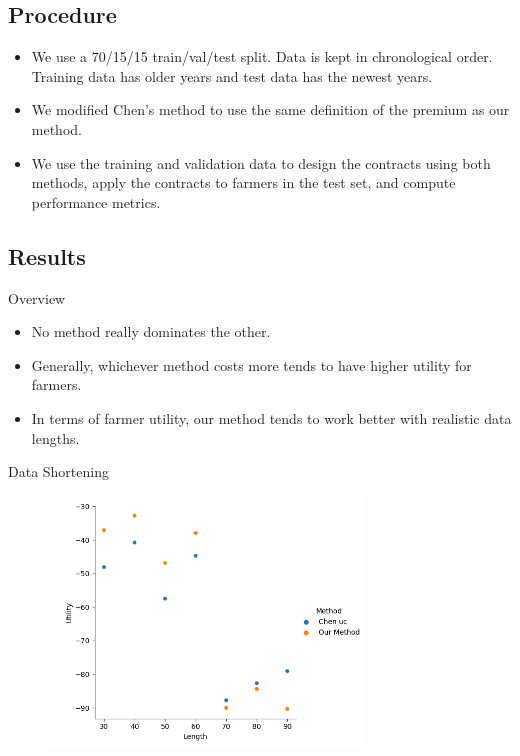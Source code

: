 \documentclass{beamer}
\begin{document}
\subsection{Procedure}
\begin{frame}
    \begin{itemize}
        \setlength\itemsep{2em}
        \item We use a 70/15/15 train/val/test split. Data is kept in chronological order. Training data has older years and test data has the newest years. 
        \item We modified Chen's method to use the same definition of the premium as our method. 
        \item We use the training and validation data to design the contracts using both methods, apply the contracts to farmers in the test set, and compute performance metrics. 
    \end{itemize}
\end{frame}


\subsection{Results}
\begin{frame}{Overview}
    \begin{itemize}
        \item No method really dominates the other. 
        \item Generally, whichever method costs more tends to have higher utility for farmers. 
        \item In terms of farmer utility, our method tends to work better with realistic data lengths. 
    \end{itemize}
\end{frame}

\begin{frame}{Data Shortening}
    \begin{figure}
        \includegraphics[width=0.75\textwidth]{../../../output/figures/Chen_Replication/Our_premium_results.png}
    \end{figure}
\end{frame}
\end{document}
